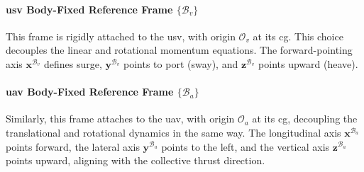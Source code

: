 \paragraph{\gls{usv} Body-Fixed Reference Frame $\{\mathcal{B}_v\}$}
This frame is rigidly attached to the \gls{usv}, with origin $\mathcal{O}_v$ at its \gls{cg}. This choice decouples the linear and rotational momentum equations. The forward-pointing axis $\mathbf{x}^{\mathcal{B}_v}$ defines surge, $\mathbf{y}^{\mathcal{B}_v}$ points to port (sway), and $\mathbf{z}^{\mathcal{B}_v}$ points upward (heave).

\paragraph{\gls{uav} Body-Fixed Reference Frame $\{\mathcal{B}_a\}$}
Similarly, this frame attaches to the \gls{uav}, with origin $\mathcal{O}_a$ at its \gls{cg}, decoupling the translational and rotational dynamics in the same way. The longitudinal axis $\mathbf{x}^{\mathcal{B}_a}$ points forward, the lateral axis $\mathbf{y}^{\mathcal{B}_a}$ points to the left, and the vertical axis $\mathbf{z}^{\mathcal{B}_a}$ points upward, aligning with the collective thrust direction.

